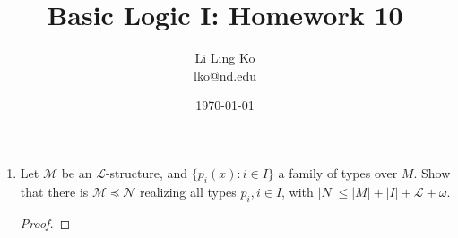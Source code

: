 \documentclass{article}
\begin{document}
\title{Basic Logic I: Homework 10}
\author{Li Ling Ko\\ lko@nd.edu}
\date{\today}
\maketitle

\begin{enumerate}[label={\bf Q\arabic*:}]
  \item Let $\mathcal{M}$ be an $\mathcal{L}$-structure, and $\{p_i(x):i\in
    I\}$ a family of types over $M$. Show that there is
    $\mathcal{M}\preceq\mathcal{N}$ realizing all types $p_i,i\in I$, with
    $|N|\leq|M|+|I|+\mathcal{L}+\omega$.

    \begin{proof}
    \end{proof}
\end{enumerate}
\end{document}
